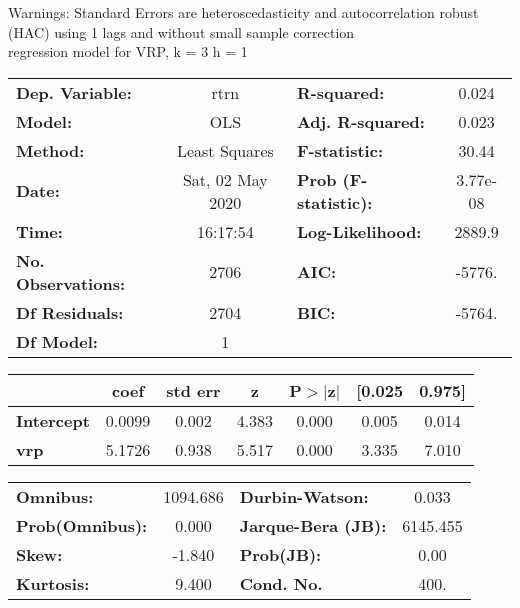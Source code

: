 Warnings: \newline
 [1] Standard Errors are heteroscedasticity and autocorrelation robust (HAC) using 1 lags and without small sample correction\\ 

regression model for VRP, k = 3 h = 1\begin{center}
\begin{tabular}{lclc}
\toprule
\textbf{Dep. Variable:}    &       rtrn       & \textbf{  R-squared:         } &     0.024   \\
\textbf{Model:}            &       OLS        & \textbf{  Adj. R-squared:    } &     0.023   \\
\textbf{Method:}           &  Least Squares   & \textbf{  F-statistic:       } &     30.44   \\
\textbf{Date:}             & Sat, 02 May 2020 & \textbf{  Prob (F-statistic):} &  3.77e-08   \\
\textbf{Time:}             &     16:17:54     & \textbf{  Log-Likelihood:    } &    2889.9   \\
\textbf{No. Observations:} &        2706      & \textbf{  AIC:               } &    -5776.   \\
\textbf{Df Residuals:}     &        2704      & \textbf{  BIC:               } &    -5764.   \\
\textbf{Df Model:}         &           1      & \textbf{                     } &             \\
\bottomrule
\end{tabular}
\begin{tabular}{lcccccc}
                   & \textbf{coef} & \textbf{std err} & \textbf{z} & \textbf{P$> |$z$|$} & \textbf{[0.025} & \textbf{0.975]}  \\
\midrule
\textbf{Intercept} &       0.0099  &        0.002     &     4.383  &         0.000        &        0.005    &        0.014     \\
\textbf{vrp}       &       5.1726  &        0.938     &     5.517  &         0.000        &        3.335    &        7.010     \\
\bottomrule
\end{tabular}
\begin{tabular}{lclc}
\textbf{Omnibus:}       & 1094.686 & \textbf{  Durbin-Watson:     } &    0.033  \\
\textbf{Prob(Omnibus):} &   0.000  & \textbf{  Jarque-Bera (JB):  } & 6145.455  \\
\textbf{Skew:}          &  -1.840  & \textbf{  Prob(JB):          } &     0.00  \\
\textbf{Kurtosis:}      &   9.400  & \textbf{  Cond. No.          } &     400.  \\
\bottomrule
\end{tabular}
\end{center}

